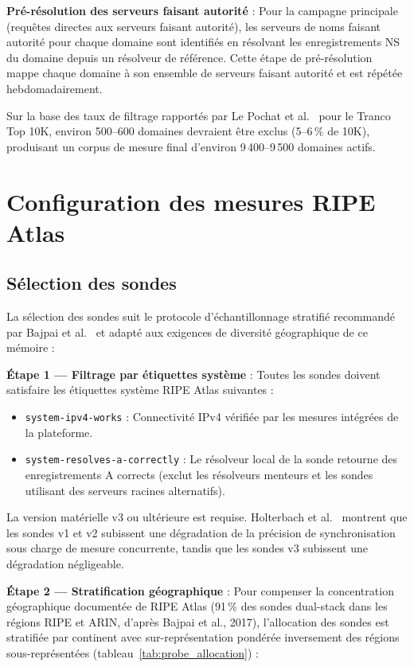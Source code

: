 \textbf{Pré-résolution des serveurs faisant autorité} : Pour la campagne principale (requêtes directes aux serveurs faisant autorité), les serveurs de noms faisant autorité pour chaque domaine sont identifiés en résolvant les enregistrements NS du domaine depuis un résolveur de référence. Cette étape de pré-résolution mappe chaque domaine à son ensemble de serveurs faisant autorité et est répétée hebdomadairement.

Sur la base des taux de filtrage rapportés par Le Pochat et al.~\cite{LePochat2019} pour le Tranco Top 10K, environ 500--600 domaines devraient être exclus (5--6\,\% de 10K), produisant un corpus de mesure final d'environ 9\,400--9\,500 domaines actifs.

\bigskip
\section{Configuration des mesures RIPE Atlas}
\label{sec:3.3}

\subsection{Sélection des sondes}
\label{subsec:3.3.1}

La sélection des sondes suit le protocole d'échantillonnage stratifié recommandé par Bajpai et al.~\cite{Bajpai2017} et adapté aux exigences de diversité géographique de ce mémoire :

\textbf{Étape 1 --- Filtrage par étiquettes système} : Toutes les sondes doivent satisfaire les étiquettes système RIPE Atlas suivantes :

\begin{itemize}
  \item \texttt{system-ipv4-works} : Connectivité IPv4 vérifiée par les mesures intégrées de la plateforme.
  \item \texttt{system-resolves-a-correctly} : Le résolveur local de la sonde retourne des enregistrements A corrects (exclut les résolveurs menteurs et les sondes utilisant des serveurs racines alternatifs).
\end{itemize}

La version matérielle v3 ou ultérieure est requise. Holterbach et al.~\cite{Holterbach2015} montrent que les sondes v1 et v2 subissent une dégradation de la précision de synchronisation sous charge de mesure concurrente, tandis que les sondes v3 subissent une dégradation négligeable.

\textbf{Étape 2 --- Stratification géographique} : Pour compenser la concentration géographique documentée de RIPE Atlas (91\,\% des sondes dual-stack dans les régions RIPE et ARIN, d'après Bajpai et al., 2017), l'allocation des sondes est stratifiée par continent avec sur-représentation pondérée inversement des régions sous-représentées (tableau~\ref{tab:probe_allocation}) :

